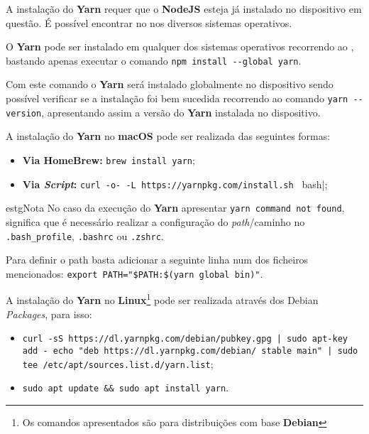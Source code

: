 \label{yarnAttachments}


A instalação do \textbf{Yarn} requer que o \textbf{NodeJS} esteja já instalado no dispositivo em questão. É possível encontrar no  nos diversos sistemas operativos.


O \textbf{Yarn} pode ser instalado em qualquer dos sistemas operativos recorrendo ao \textbf{}, bastando apenas executar o comando \verb|npm install --global yarn|.

Com este comando o \textbf{Yarn} será instalado globalmente no dispositivo sendo possível verificar se a instalação foi bem sucedida recorrendo ao comando \verb|yarn --version|, apresentando assim a versão do \textbf{Yarn} instalada no dispositivo.


A instalação do \textbf{Yarn} no \textbf{macOS} pode ser realizada das seguintes formas:

\begin{itemize}
	\item \textbf{Via HomeBrew:} \verb|brew install yarn|;
	\item \textbf{Via \textit{Script}:} \verb|curl -o- -L https://yarnpkg.com/install.sh | bash|;
\end{itemize}

\begin{mybox}{estg}{Nota}
	No caso da execução do \textbf{Yarn} apresentar \verb|yarn command not found|, significa que é necessário realizar a configuração do \textit{path}/caminho no \verb|.bash_profile|, \verb|.bashrc| ou \verb|.zshrc|.

	\vspace{5pt}

	Para definir o path basta adicionar a seguinte linha num dos ficheiros mencionados: \verb|export PATH="$PATH:$(yarn global bin)"|.
\end{mybox}


A instalação do \textbf{Yarn} no \textbf{Linux}\footnote{Os comandos apresentados são para distribuições com base \textbf{Debian}} pode ser realizada através dos Debian \textit{Packages}, para isso:

\begin{itemize}
	\item \texttt{curl -sS https://dl.yarnpkg.com/debian/pubkey.gpg | sudo apt-key add -
echo "deb https://dl.yarnpkg.com/debian/ stable main" | sudo tee /etc/apt/sources.list.d/yarn.list};
	\item \verb|sudo apt update && sudo apt install yarn|.
\end{itemize}

